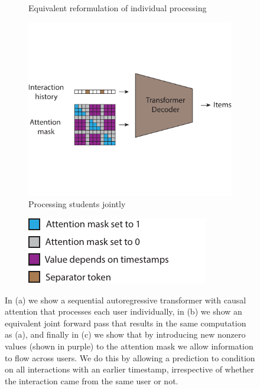 \documentclass{article}
\begin{document}
\begin{figure}
\begin{subfigure}[t]{0.3136\linewidth}
        \caption{Equivalent reformulation of individual processing}
    \end{subfigure}
    \hfill
       \begin{subfigure}[t]{0.3136\linewidth}
        \includegraphics[width=\linewidth]{figures/main/study.pdf}
        \caption{Processing students jointly}
    \end{subfigure}
    
    \begin{subfigure}[t]{0.0323\linewidth}
     \vspace{2em}
      \includegraphics[width=\linewidth]{figures/main/key.pdf}
    \end{subfigure}
    \caption{In (a) we show a sequential autoregressive transformer with causal attention that processes each user individually, in (b) we show an equivalent joint forward pass that results in the same computation as (a), and finally in (c) we show that by introducing new nonzero values (shown in purple) to the attention mask we allow information to flow across users. We do this by allowing a prediction to condition on all interactions with an earlier timestamp, irrespective of whether the interaction came from the same user or not.}
    \label{figure:main}
\end{figure}
\end{document}
